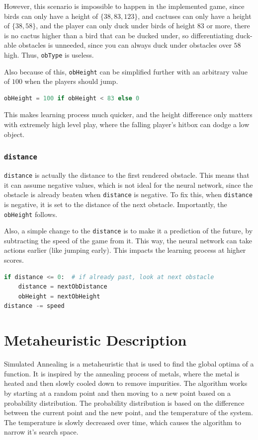 \documentclass[review]{elsarticle}
\begin{document}
However, this scenario is impossible to happen in the implemented game, since birds can only have a height of $\{38, 83, 123\}$, and cactuses can only have a height of $\{38, 58\}$, and the player can only duck under birds of height $83$ or more, there is no cactus higher than a bird that can be ducked under, so differentiating duck-able obstacles is unneeded, since you can always duck under obstacles over $58$ high. Thus, \texttt{obType} is useless.

Also because of this, \texttt{obHeight} can be simplified further with an arbitrary value of $100$ when the players should jump.
\begin{lstlisting}[language=Python]
obHeight = 100 if obHeight < 83 else 0
\end{lstlisting}
This makes learning process much quicker, and the height difference only matters with extremely high level play, where the falling player's hitbox can dodge a low object.

\subsubsection{\texttt{distance}}

\texttt{distance} is actually the distance to the first rendered obstacle. This means that it can assume negative values, which is not ideal for the neural network, since the obstacle is already beaten when \texttt{distance} is negative. To fix this, when \texttt{distance} is negative, it is set to the distance of the next obstacle. Importantly, the \texttt{obHeight} follows.

Also, a simple change to the \texttt{distance} is to make it a prediction of the future, by subtracting the speed of the game from it. This way, the neural network can take actions earlier (like jumping early). This impacts the learning process at higher scores.

\begin{lstlisting}[language=Python]
if distance <= 0:  # if already past, look at next obstacle
    distance = nextObDistance
    obHeight = nextObHeight
distance -= speed
\end{lstlisting}

\section{Metaheuristic Description}

Simulated Annealing is a metaheuristic that is used to find the global optima of a function. It is inspired by the annealing process of metals, where the metal is heated and then slowly cooled down to remove impurities. The algorithm works by starting at a random point and then moving to a new point based on a probability distribution. The probability distribution is based on the difference between the current point and the new point, and the temperature of the system. The temperature is slowly decreased over time, which causes the algorithm to narrow it's search space.
\end{document}
